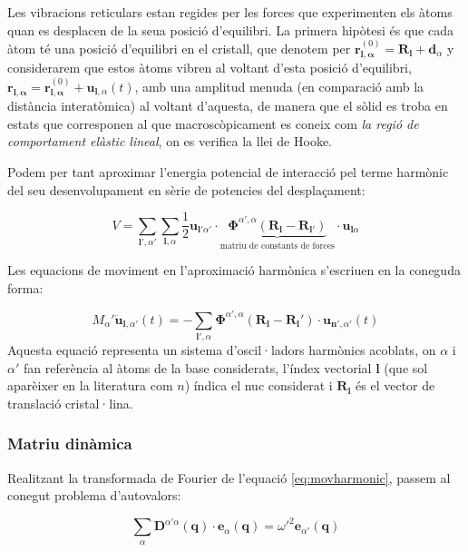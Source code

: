 \documentclass[12pt]{article} %
\let\vec\mathbf %
\begin{document}
{Les vibracions reticulars estan regides per les forces que experimenten els àtoms quan es desplacen de la seua posició d'equilibri. La primera hipòtesi és que cada àtom té una posició d'equilibri en el cristall, que denotem per $\vec r^{(0)}_{\vec l,\vec\alpha}=\vec R_\vec l+\vec d_\alpha$ y considerarem que estos àtoms vibren al voltant d'esta posició d'equilibri, $\vec r_{\vec l,\vec\alpha}=\vec r^{(0)}_{\vec l,\vec\alpha}+\vec u_{\vec l,\alpha}(t)$, amb una amplitud menuda (en comparació amb la distància interatòmica) al voltant d'aquesta,   de manera que el sòlid es troba en estats que corresponen al que macroscòpicament es coneix com \textit{la regió de comportament elàstic lineal}, on es verifica la llei de Hooke.

Podem per tant aproximar l'energia potencial de interacció pel terme harmònic del seu desenvolupament en sèrie de potencies del despla\c{c}ament:

\begin{equation}
 V=\sum_{\vec l',\alpha'}\sum_{\vec l,\alpha}\frac{1}{2}\vec u_{\vec l'\alpha'}\cdot\underbrace{\vec\Phi^{\alpha',\alpha}(\vec R_{\vec l}-\vec R_{\vec l'})}_\text{matriu de constants de forces}\cdot\vec u_{\vec l\alpha}
\end{equation}

Les equacions de moviment en l'aproximació harmònica s'escriuen en la coneguda forma:

\begin{equation}
\label{eq:movharmonic}
 M_\alpha'\vec{\ddot{u}}_{\vec l,\alpha'}(t)=-\sum_{\vec l',\alpha}\vec\Phi^{\alpha',\alpha}\left(\vec R_\vec l-\vec R_\vec l'\right)\cdot\vec u_{\vec n',\alpha'}(t)
\end{equation}
 Aquesta equació representa un sistema  d'oscil·ladors harmònics acoblats, on $\alpha$ i $\alpha'$ fan referència al àtoms de la base considerats, l'índex vectorial $\vec l$ (que sol aparèixer en la literatura com $n$) índica el nuc considerat i $\vec R_\vec l$ és el vector de translació cristal·lina.
 
\subsubsection{Matriu dinàmica}
Realitzant la transformada de Fourier de l'equació \ref{eq:movharmonic}, passem al conegut problema d'autovalors:

\begin{equation}
\sum_{\alpha}\vec D^{\alpha'\alpha}(\vec q)\cdot\vec e_{\alpha}(\vec q)={\omega'}^{2}\vec e_{\alpha'}(\vec q)
\end{equation}   

}
\end{document}
